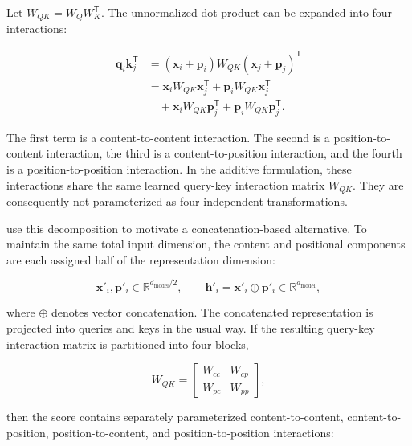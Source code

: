 Let \(W_{QK}=W_QW_K^{\mathsf T}\). The unnormalized dot product can be
expanded into four interactions:

\begin{align}
    \mathbf{q}_i\mathbf{k}_j^{\mathsf T}
    &=
    (\mathbf{x}_i+\mathbf{p}_i)
    W_{QK}
    (\mathbf{x}_j+\mathbf{p}_j)^{\mathsf T}
    \nonumber\\
    &=
    \mathbf{x}_iW_{QK}\mathbf{x}_j^{\mathsf T}
    +\mathbf{p}_iW_{QK}\mathbf{x}_j^{\mathsf T}
    \nonumber\\
    &\quad+
    \mathbf{x}_iW_{QK}\mathbf{p}_j^{\mathsf T}
    +\mathbf{p}_iW_{QK}\mathbf{p}_j^{\mathsf T}.
    \label{eq:pe-additive-four-terms}
\end{align}

The first term is a content-to-content interaction. The second is a
position-to-content interaction, the third is a content-to-position
interaction, and the fourth is a position-to-position interaction. In the
additive formulation, these interactions share the same learned
query-key interaction matrix \(W_{QK}\). They are consequently not
parameterized as four independent transformations.

\textcite{zhou2024rethinking} use this decomposition to motivate a
concatenation-based alternative. To maintain the same total input dimension,
the content and positional components are each assigned half of the
representation dimension:

\begin{equation}
    \mathbf{x}'_i,\mathbf{p}'_i
    \in\mathbb{R}^{d_{\mathrm{model}}/2},
    \qquad
    \mathbf{h}'_i=
    \mathbf{x}'_i\oplus\mathbf{p}'_i
    \in\mathbb{R}^{d_{\mathrm{model}}},
    \label{eq:pe-concatenated-input}
\end{equation}

where \(\oplus\) denotes vector concatenation. The concatenated
representation is projected into queries and keys in the usual way. If the
resulting query-key interaction matrix is partitioned into four blocks,

\begin{equation}
    W_{QK}=
    \begin{bmatrix}
        W_{cc}&W_{cp}\\
        W_{pc}&W_{pp}
    \end{bmatrix},
    \label{eq:pe-concat-block-matrix}
\end{equation}

then the score contains separately parameterized content-to-content,
content-to-position, position-to-content, and position-to-position
interactions:

